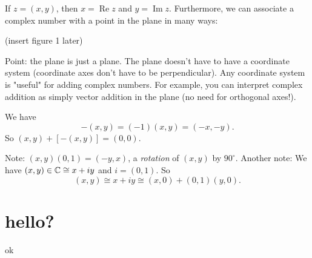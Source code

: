 \begin{definition}
    If $z=(x,y)$, then $x=\operatorname{Re}z$ and $y=\operatorname{Im}z.$ Furthermore, we can associate a complex number with a point in the plane in many ways:
\end{definition}
(insert figure 1 later)

\vspace{3mm}

Point: the plane is just a plane. The plane doesn't have to have a coordinate system (coordinate axes don't have to be perpendicular). Any coordinate system is "useful" for adding complex numbers. For example, you can interpret complex addition as simply vector addition in the plane (no need for orthogonal axes!).

\begin{definition}
    We have \[
        -(x,y)=(-1)(x,y)=(-x,-y).
    \]
    So $(x,y)+[-(x,y)]=(0,0)$.
\end{definition}

Note: $(x,y)(0,1)=(-y,x)$, a \textit{rotation} of $(x,y)$ by $90^{\circ}$.
Another note: We have $(x,y)\in\mathbb{C} \cong x+iy$ and $i=(0,1).$ So 
\[
(x,y) \cong x+iy \cong (x,0)+(0,1)(y,0).
\]
\section{hello?}
\begin{definition}
    ok
\end{definition}
